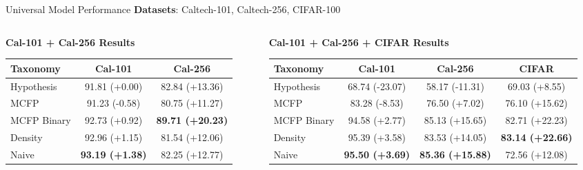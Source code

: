 \documentclass[aspectratio=169]{beamer}
\begin{document}
\begin{frame}{Universal Model Performance}
    \textbf{Datasets}: Caltech-101, Caltech-256, CIFAR-100

    \begin{columns}[T]
        \begin{column}{0.48\textwidth}
            \textbf{Cal-101 + Cal-256 Results}
            \begin{table}[h]
                \centering
                \tiny
                \begin{tabular}{lcc}
                    \toprule
                    \textbf{Taxonomy} & \textbf{Cal-101}       & \textbf{Cal-256}        \\
                    \midrule
                    Hypothesis        & 91.81 (+0.00)          & 82.84 (+13.36)          \\
                    MCFP              & 91.23 (-0.58)          & 80.75 (+11.27)          \\
                    MCFP Binary       & 92.73 (+0.92)          & \textbf{89.71 (+20.23)} \\
                    Density           & 92.96 (+1.15)          & 81.54 (+12.06)          \\
                    Naive             & \textbf{93.19 (+1.38)} & 82.25 (+12.77)          \\
                    \bottomrule
                \end{tabular}
            \end{table}
        \end{column}

        \begin{column}{0.48\textwidth}
            \textbf{Cal-101 + Cal-256 + CIFAR Results}
            \begin{table}[h]
                \centering
                \tiny
                \begin{tabular}{lccc}
                    \toprule
                    \textbf{Taxonomy} & \textbf{Cal-101}       & \textbf{Cal-256}        & \textbf{CIFAR}          \\
                    \midrule
                    Hypothesis        & 68.74 (-23.07)         & 58.17 (-11.31)          & 69.03 (+8.55)           \\
                    MCFP              & 83.28 (-8.53)          & 76.50 (+7.02)           & 76.10 (+15.62)          \\
                    MCFP Binary       & 94.58 (+2.77)          & 85.13 (+15.65)          & 82.71 (+22.23)          \\
                    Density           & 95.39 (+3.58)          & 83.53 (+14.05)          & \textbf{83.14 (+22.66)} \\
                    Naive             & \textbf{95.50 (+3.69)} & \textbf{85.36 (+15.88)} & 72.56 (+12.08)          \\
                    \bottomrule
                \end{tabular}
            \end{table}
        \end{column}
    \end{columns}


\end{frame}
\end{document}
